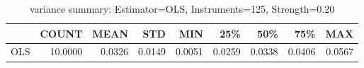 \begin{table}[ht]
\centering
\caption{variance summary: Estimator=OLS, Instruments=125, Strength=0.20}
\begin{tabular}{lrrrrrrrr}
\toprule
 & COUNT & MEAN & STD & MIN & 25\% & 50\% & 75\% & MAX \\
\midrule
OLS & 10.0000 & 0.0326 & 0.0149 & 0.0051 & 0.0259 & 0.0338 & 0.0406 & 0.0567 \\
\bottomrule
\end{tabular}
\end{table}
